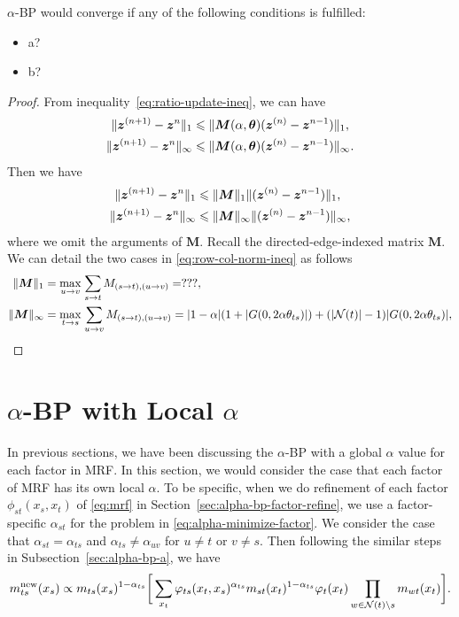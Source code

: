 \documentclass[conference,onecolumn]{IEEEtran}
\begin{document}
\begin{cor}
  $\alpha$-BP would converge if any of the following conditions is fulfilled:
  \begin{itemize}
  \item a?
  \item b?
  \end{itemize}
\end{cor}
\begin{proof}
  From inequality~\ref{eq:ratio-update-ineq}, we can have
  \begin{align}
    \| \bm{z}^{(n+1)} - \bm{z}^{n} \|_{1} &\leqslant \| \bm{M}(\alpha, \bm{\theta})(\bm{z}^{(n)} - \bm{z}^{n-1}) \|_{1}, \nonumber \\
    \| \bm{z}^{(n+1)} - \bm{z}^{n} \|_{\infty} &\leqslant \| \bm{M}(\alpha, \bm{\theta})(\bm{z}^{(n)} - \bm{z}^{n-1}) \|_{\infty}.
  \end{align}
  Then we have
  \begin{align}\label{eq:row-col-norm-ineq}
    \| \bm{z}^{(n+1)} - \bm{z}^{n} \|_{1} &\leqslant \| \bm{M} \|_{1}\| (\bm{z}^{(n)} - \bm{z}^{n-1}) \|_{1}, \nonumber \\
    \| \bm{z}^{(n+1)} - \bm{z}^{n} \|_{\infty} &\leqslant \| \bm{M} \|_{\infty}\| (\bm{z}^{(n)} - \bm{z}^{n-1}) \|_{\infty},
  \end{align}
  where we omit the arguments of $\bm{M}$. Recall the directed-edge-indexed matrix $\bm{M}$. We can detail the two cases in \ref{eq:row-col-norm-ineq} as follows
  \begin{align}
    \| \bm{M} \|_{1} &= \underset{u \rightarrow v}{\max}\;{\sum_{s\rightarrow t} M_{(s\rightarrow t), (u\rightarrow v)}} = ???, \nonumber \\
    \| \bm{M} \|_{\infty} &= \underset{t \rightarrow s}{\max}\;{\sum_{u\rightarrow v} M_{(s\rightarrow t), (u\rightarrow v)}} = | 1-\alpha | (1 + | G(0, 2\alpha \theta_{ts}) |) + (| \mathcal{N}(t) |-1)| G(0, 2\alpha \theta_{ts}) |,
  \end{align}
\end{proof}

\section{$\alpha$-BP with Local $\alpha$}
In previous sections, we have been discussing the $\alpha$-BP with a global $\alpha$ value for each factor in MRF. In this section, we would consider the case that each factor of MRF has its own local $\alpha$. To be specific, when we do refinement of each factor $\phi_{st}(x_s, x_t)$ of \eqref{eq:mrf} in Section~\ref{sec:alpha-bp-factor-refine}, we use a factor-specific $\alpha_{st}$
for the problem in \eqref{eq:alpha-minimize-factor}. We consider the case that $\alpha_{st} = \alpha_{ts}$ and $\alpha_{ts} \neq \alpha_{uv}$ for $u \neq t$ or $v \neq s$. Then following the similar steps in Subsection~\ref{sec:alpha-bp-a}, we have
\begin{equation}\label{eq:message-rule-local}
  {m}^{\text{new}}_{ts}(x_s) \propto  m_{ts}(x_s)^{1-\alpha_{ts}} \bigg[
  \sum_{x_t} \varphi_{ts}(x_t, x_s)^{\alpha_{ts}} {m}_{st}(x_t)^{1-\alpha_{ts}} {\varphi}_t(x_t) \prod_{w\in \mathcal{N}(t)\backslash s}m_{wt}(x_t) \bigg].
\end{equation}
\end{document}
